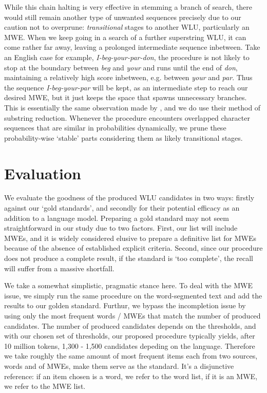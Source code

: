 \documentclass[a4]{article}
\begin{document}
While this chain halting is very effective in stemming a branch of search, there would still remain another type of unwanted sequences precisely due to our caution not to overprune: \emph{transitional} stages to another WLU, particularly an MWE. When we keep going in a search of a further superstring WLU, it can come rather far away, leaving a prolonged intermediate sequence inbetween. Take an English case for example, \emph{I-beg-your-par-don}, the procedure is not likely to stop at the boundary between \emph{beg} and \emph{your} and runs until the end of \emph{don}, maintaining a relatively high score inbetween, e.g. between \emph{your} and \emph{par}. Thus the sequence \emph{I-beg-your-par} will be kept, as an intermediate step to reach our desired MWE, but it just keeps the space that spawns unnecessary branches. This is essentially the same observation made by \cite{LuEtAl04_substringReduction}, and we do use their method of substring reduction. Whenever the procedure encounters overlapped character sequences that are similar in probabilities dynamically, we  prune these probability-wise `stable' parts considering them as likely transitional stages.



\section{Evaluation}

We evaluate the goodness of the produced WLU candidates in two ways: firstly against our `gold standards', and secondly for their potential efficacy as an addition to a language model. Preparing a gold standard may not seem straightforward in our study due to two factors. First, our list will include MWEs, and it is widely considered elusive to prepare a definitive list for MWEs because of the absence of established explicit criteria. Second, since our procedure does not produce a complete result, if the standard is `too complete', the recall will suffer from a massive shortfall. 

We take a somewhat simplistic, pragmatic stance here. To deal with the MWE issue, we simply run the same procedure on the word-segmented text and add the results to our golden standard. Furthur, we bypass the incompletion issue by using only the most frequent words / MWEs that match the number of produced candidates. The number of produced candidates depends on the thresholds, and with our chosen set of thresholds, our proposed procedure typically yields, after 10 million tokens, 1,300 - 1,500 candidates depeding on the language. Therefore we take roughly the same amount of most frequent items each from two sources, words and of MWEs, make them serve as the standard. It's a disjunctive reference: if an item chosen is a word, we refer to the word list, if it is an MWE, we refer to the MWE list.
\end{document}

